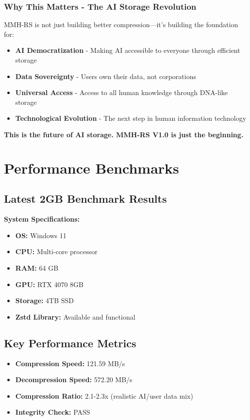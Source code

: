 \documentclass[11pt,a4paper]{article}
\begin{document}
	\subsubsection{Why This Matters - The AI Storage Revolution}

	MMH-RS is not just building better compression—it's building the foundation for:
	\begin{itemize}
		\item \textbf{AI Democratization} - Making AI accessible to everyone through efficient storage
		\item \textbf{Data Sovereignty} - Users own their data, not corporations
		\item \textbf{Universal Access} - Access to all human knowledge through DNA-like storage
		\item \textbf{Technological Evolution} - The next step in human information technology
	\end{itemize}

	\textbf{This is the future of AI storage. MMH-RS V1.0 is just the beginning.}

	\section{Performance Benchmarks}
	\label{sec:benchmarks}

	\subsection{Latest 2GB Benchmark Results}

	\textbf{System Specifications:}
	\begin{itemize}
		\item \textbf{OS:} Windows 11
		\item \textbf{CPU:} Multi-core processor
		\item \textbf{RAM:} 64 GB
		\item \textbf{GPU:} RTX 4070 8GB
		\item \textbf{Storage:} 4TB SSD
		\item \textbf{Zstd Library:} Available and functional
	\end{itemize}

	\subsection{Key Performance Metrics}
	\begin{itemize}
		\item \textbf{Compression Speed:} 121.59 MB/s
		\item \textbf{Decompression Speed:} 572.20 MB/s
		\item \textbf{Compression Ratio:} 2.1-2.3x (realistic AI/user data mix)
		\item \textbf{Integrity Check:} PASS
	\end{itemize}
\end{document}
